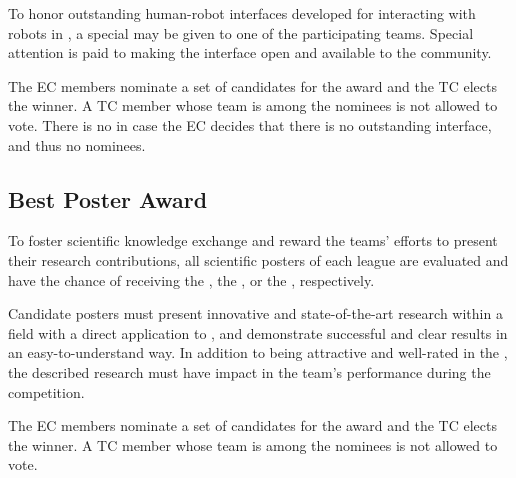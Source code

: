 To honor outstanding human-robot interfaces developed for interacting with robots in \AtHome{}, a special \HRIAward{} may be given to one of the participating teams.
Special attention is paid to making the interface open and available to the \AtHome{} community.

The \AtHome{} EC members nominate a set of candidates for the award and the TC elects the winner.
A TC member whose team is among the nominees is not allowed to vote.
There is no \HRIAward{} in case the EC decides that there is no outstanding interface, and thus no nominees.

\subsection{Best Poster Award}
\label{award:poster}

To foster scientific knowledge exchange and reward the teams' efforts to present their research contributions, all scientific posters of each league are evaluated and have the chance of receiving the \DSPLPosterAward, the \OPLPosterAward, or the \SSPLPosterAward, respectively.

Candidate posters must present innovative and state-of-the-art research within a field with a direct application to \AtHome, and demonstrate successful and clear results in an easy-to-understand way.
In addition to being attractive and well-rated in the \PS{}, the described research must have impact in the team's performance during the competition.

The \AtHome{} EC members nominate a set of candidates for the award and the TC elects the winner.
A TC member whose team is among the nominees is not allowed to vote.

%
%
%

